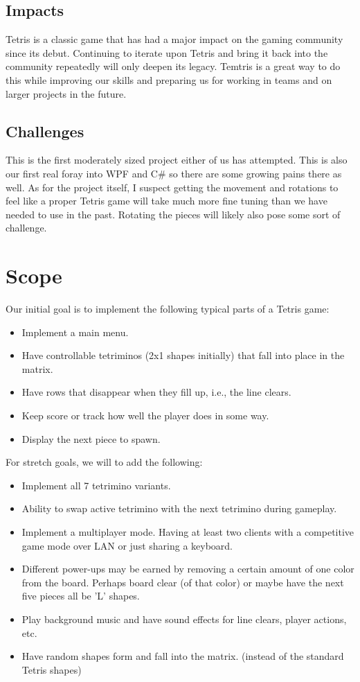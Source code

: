 \documentclass[10pt,conference,onecolumn,compsoc]{IEEEtran}
\begin{document}
\subsection{Impacts}
Tetris is a classic game that has had a major impact on the gaming community since its debut. Continuing to iterate upon Tetris and bring it back into the community repeatedly will only deepen its legacy. Temtris is a great way to  do this while improving our skills and preparing us for working in teams and on larger projects in the future.

\subsection{Challenges}
This is the first moderately sized project either of us has attempted. This is also our first real foray into WPF and C\# so there are some growing pains there as well. As for the project itself, I suspect getting the movement and rotations to feel like a proper Tetris game will take much more fine tuning than we have needed to use in the past. Rotating the pieces will likely also pose some sort of challenge.

\section{Scope}
Our initial goal is to implement the following typical parts of a Tetris game: 
\begin{itemize}
\item Implement a main menu.
\item Have controllable tetriminos (2x1 shapes initially) that fall into place in the matrix. 
\item Have rows that disappear when they fill up, i.e., the line clears.
\item Keep score or track how well the player does in some way.
\item Display the next piece to spawn.
\end{itemize}

For stretch goals, we will to add the following:
\begin{itemize}
\item Implement all 7 tetrimino variants.
\item Ability to swap active tetrimino with the next tetrimino during gameplay.
\item Implement a multiplayer mode. Having at least two clients with a competitive game mode over LAN or just sharing a keyboard.
\item Different power-ups may be earned by removing a certain amount of one color from the board. Perhaps board clear (of that color) or maybe have the next five pieces all be 'L' shapes.
\item Play background music and have sound effects for line clears, player actions, etc.
\item Have random shapes form and fall into the matrix. (instead of the standard Tetris shapes)
\end{itemize}
\end{document}
